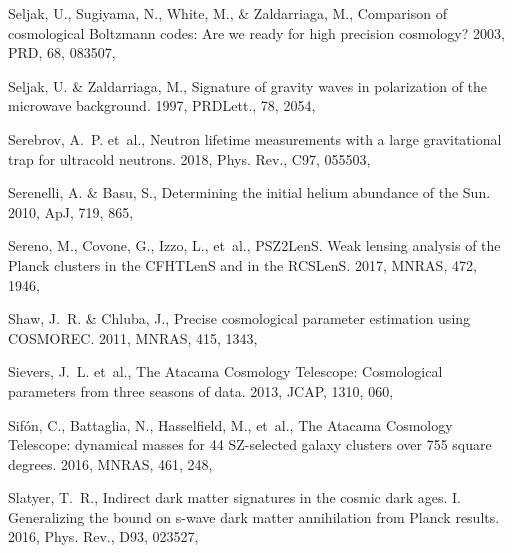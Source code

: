 \documentclass[longauth,traditabstract]{aa}
\def\apj{{ApJ}}
\def\mnras{{MNRAS}}
\def\prd{{PRD}}
\begin{document}
\begin{thebibliography}{379}
{Seljak}, U., {Sugiyama}, N., {White}, M., \& {Zaldarriaga}, M., {Comparison of
  cosmological Boltzmann codes: Are we ready for high precision cosmology?}
  2003, \prd, 68, 083507, 

Seljak, U. \& Zaldarriaga, M., Signature of gravity waves in polarization of
  the microwave background. 1997, \prd Lett., 78, 2054,

Serebrov, A.~P. {et~al.}, {Neutron lifetime measurements with a large
  gravitational trap for ultracold neutrons}. 2018, Phys. Rev., C97, 055503,

Serenelli, A. \& Basu, S., {Determining the initial helium abundance of the
  Sun}. 2010, \apj, 719, 865, 

Sereno, M., Covone, G., Izzo, L., {et~al.}, {PSZ2LenS. Weak lensing analysis of
  the Planck clusters in the CFHTLenS and in the RCSLenS}. 2017, \mnras, 472,
  1946, 

{Shaw}, J.~R. \& {Chluba}, J., {Precise cosmological parameter estimation using
  COSMOREC}. 2011, \mnras, 415, 1343, 

Sievers, J.~L. {et~al.}, {The Atacama Cosmology Telescope: Cosmological
  parameters from three seasons of data}. 2013, JCAP, 1310, 060,

{Sif{\'o}n}, C., {Battaglia}, N., {Hasselfield}, M., {et~al.}, {The Atacama
  Cosmology Telescope: dynamical masses for 44 SZ-selected galaxy clusters over
  755 square degrees}. 2016, \mnras, 461, 248, 

Slatyer, T.~R., {Indirect dark matter signatures in the cosmic dark ages. I.
  Generalizing the bound on s-wave dark matter annihilation from Planck
  results}. 2016{}, Phys. Rev., D93, 023527, 


\end{thebibliography}
\end{document}
